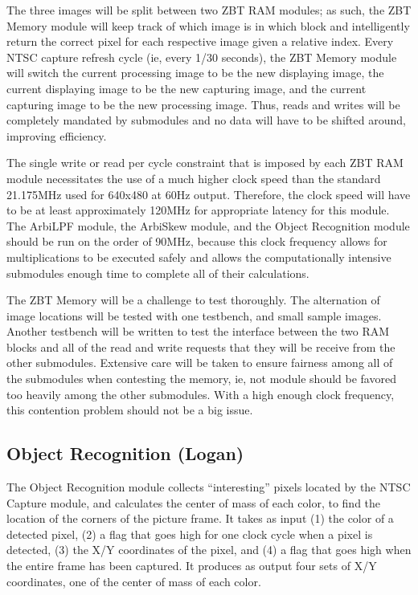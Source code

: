 \documentclass[10pt]{article}
\begin{document}
The three images will be split between two ZBT RAM modules; as such, the ZBT Memory module will keep track of which image is in which block and intelligently return the correct pixel for each respective image given a relative index. Every NTSC capture refresh cycle (ie, every 1/30 seconds), the ZBT Memory module will switch the current processing image to be the new displaying image, the current displaying image to be the new capturing image, and the current capturing image to be the new processing image. Thus, reads and writes will be completely mandated by submodules and no data will have to be shifted around, improving efficiency.

The single write or read per cycle constraint that is imposed by each ZBT RAM module necessitates the use of a much higher clock speed than the standard 21.175MHz used for 640x480 at 60Hz output. Therefore, the clock speed will have to be at least approximately 120MHz for appropriate latency for this module. The ArbiLPF module, the ArbiSkew module, and the Object Recognition module should be run on the order of 90MHz, because this clock frequency allows for multiplications to be executed safely and allows the computationally intensive submodules enough time to complete all of their calculations.

The ZBT Memory will be a challenge to test thoroughly. The alternation of image locations will be tested with one testbench, and small sample images. Another testbench will be written to test the interface between the two RAM blocks and all of the read and write requests that they will be receive from the other submodules. Extensive care will be taken to ensure fairness among all of the submodules when contesting the memory, ie, not module should be favored too heavily among the other submodules. With a high enough clock frequency, this contention problem should not be a big issue.

\subsection{Object Recognition (Logan)}
The Object Recognition module collects ``interesting'' pixels located by the NTSC Capture module, and calculates the center of mass of each color, to find the location of the corners of the picture frame. It takes as input (1) the color of a detected pixel, (2) a flag that goes high for one clock cycle when a pixel is detected, (3) the X/Y coordinates of the pixel, and (4) a flag that goes high when the entire frame has been captured. It produces as output four sets of X/Y coordinates, one of the center of mass of each color.
\end{document}
